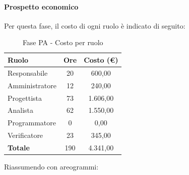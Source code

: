 \documentclass[../PianoProgetto.tex]{subfiles}
\begin{document}
	\paragraph{Prospetto economico}
					Per questa fase, il costo di ogni ruolo è indicato di seguito:
	\begin{table}[h]
		\centering
	
		\begin{tabular}{l * {2}{c}}
			\toprule
			\textbf{Ruolo} & \textbf{Ore} & \textbf{Costo (\euro{})} \\
			\midrule
			Responsabile &	20 & 600,00 \\
			Amministratore & 12 & 240,00 \\
			Progettista & 73 & 1.606,00 \\
			Analista & 62 & 1.550,00 \\
			Programmatore & 0 & 0,00 \\
			Verificatore & 23 & 345,00 \\
			\midrule		
			\textbf{Totale} & 190 & 4.341,00 \\
			\bottomrule
		\end{tabular}
		\caption{Fase PA - Costo per ruolo}
		\label{tab:fasePA_costo}
	\end{table}
\vfill	
	Riassumendo con areogrammi:
\end{document}
